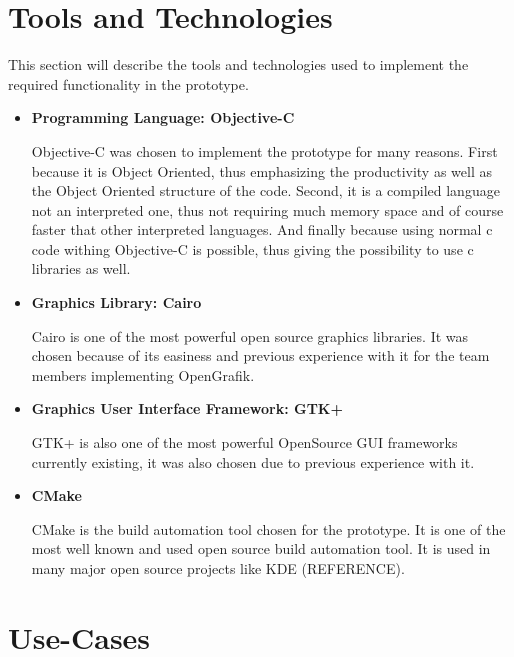 \section{Tools and Technologies}
This section will describe the tools and technologies used to implement the required functionality in the prototype.
\begin{itemize}
\item {\bf Programming Language: Objective-C}
\par \noindent
Objective-C was chosen to implement the prototype for many reasons. First because it is Object Oriented, thus emphasizing the productivity as well as the Object Oriented structure of the code. Second, it is a compiled language not an interpreted one, thus not requiring much memory space and of course faster that other interpreted languages. And finally because using normal c code withing Objective-C is possible, thus giving the possibility to use c libraries as well.

\item {\bf Graphics Library: Cairo}
\par \noindent
Cairo is one of the most powerful open source graphics libraries. It was chosen because of its easiness and previous experience with it for the team members implementing OpenGrafik.

\item {\bf Graphics User Interface Framework: GTK+}
\par \noindent
GTK+ is also one of the most powerful OpenSource GUI frameworks currently existing, it was also chosen due to previous experience with it.

\item {\bf CMake}
\par \noindent
CMake is the build automation tool chosen for the prototype. It is one of the most well known and used open source build automation tool. It is used in many major open source projects like KDE (REFERENCE).
\end{itemize}

\section{Use-Cases}

